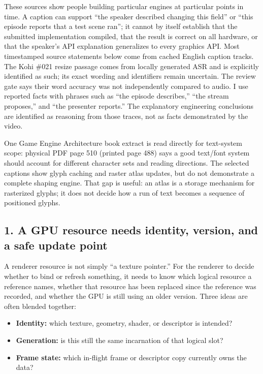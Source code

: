 These sources show people building particular engines at particular points in time. A caption can support ``the speaker described changing this field'' or ``this episode reports that a test scene ran''; it cannot by itself establish that the submitted implementation compiled, that the result is correct on all hardware, or that the speaker's API explanation generalizes to every graphics API. Most timestamped source statements below come from cached English caption tracks. The Kohi \#021 resize passage comes from locally generated ASR and is explicitly identified as such; its exact wording and identifiers remain uncertain. The review gate says their word accuracy was not independently compared to audio. I use reported facts with phrases such as ``the episode describes,'' ``the stream proposes,'' and ``the presenter reports.'' The explanatory engineering conclusions are identified as reasoning from those traces, not as facts demonstrated by the video.

One Game Engine Architecture book extract is read directly for text-system scope: physical PDF page 510 (printed page 488) says a good text/font system should account for different character sets and reading directions. The selected captions show glyph caching and raster atlas updates, but do not demonstrate a complete shaping engine. That gap is useful: an atlas is a storage mechanism for rasterized glyphs; it does not decide how a run of text becomes a sequence of positioned glyphs.

\subsection{1. A GPU resource needs identity, version, and a safe update point}\label{06-engine-ii-ch041-a-gpu-resource-needs-identity-version-and-a-safe-update-point}

\hypertarget{06-engine-ii-ch041-a-gpu-resource-needs-identity-version-and-a-safe-update-point}{}

A renderer resource is not simply ``a texture pointer.'' For the renderer to decide whether to bind or refresh something, it needs to know which logical resource a reference names, whether that resource has been replaced since the reference was recorded, and whether the GPU is still using an older version. Three ideas are often blended together:

\begin{itemize}
\tightlist
\item
  \textbf{Identity:} which texture, geometry, shader, or descriptor is intended?
\item
  \textbf{Generation:} is this still the same incarnation of that logical slot?
\item
  \textbf{Frame state:} which in-flight frame or descriptor copy currently owns the data?
\end{itemize}


